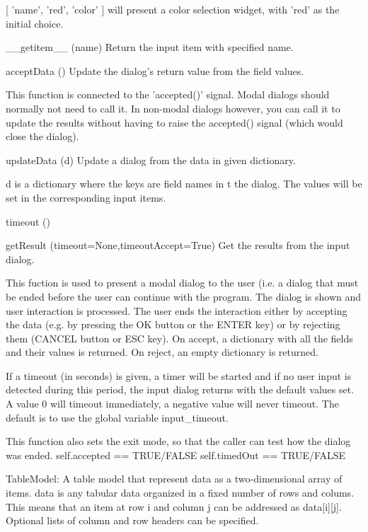         [ 'name', 'red', 'color' ] will present a color selection widget,
        with 'red' as the initial choice.
        

__getitem__ (name)
Return the input item with specified name.

acceptData ()
Update the dialog's return value from the field values.

        This function is connected to the 'accepted()' signal.
        Modal dialogs should normally not need to call it.
        In non-modal dialogs however, you can call it to update the
        results without having to raise the accepted() signal (which
        would close the dialog).
        

updateData (d)
Update a dialog from the data in given dictionary.

        d is a dictionary where the keys are field names in t the dialog.
        The values will be set in the corresponding input items.
        

timeout ()


getResult (timeout=None,timeoutAccept=True)
 Get the results from the input dialog.

        This fuction is used to present a modal dialog to the user (i.e. a
        dialog that must be ended before the user can continue with the
        program. The dialog is shown and user interaction is processed.
        The user ends the interaction either by accepting the data (e.g. by
        pressing the OK button or the ENTER key) or by rejecting them (CANCEL
        button or ESC key).
        On accept, a dictionary with all the fields and their values is
        returned. On reject, an empty dictionary is returned.
        
        If a timeout (in seconds) is given, a timer will be started and if no
        user input is detected during this period, the input dialog returns
        with the default values set.
        A value 0 will timeout immediately, a negative value will never timeout.
        The default is to use the global variable input_timeout.

        This function also sets the exit mode, so that the caller can test how
        the dialog was ended.
        self.accepted == TRUE/FALSE
        self.timedOut == TRUE/FALSE
        

TableModel: A table model that represent data as a two-dimensional array of items.
    data is any tabular data organized in a fixed number of rows and colums.
    This means that an item at row i and column j can be addressed as
    data[i][j].
    Optional lists of column and row headers can be specified.
    
